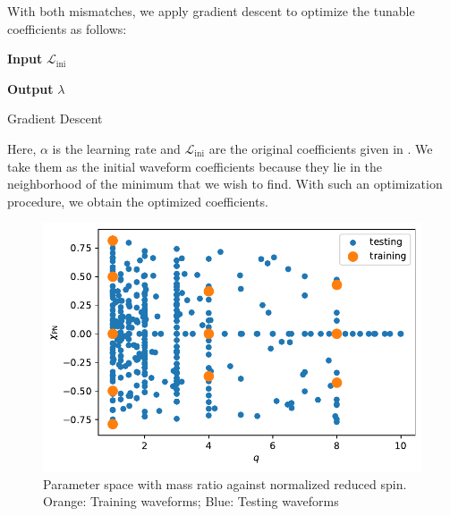 \documentclass[twocolumn]{aastex631}
\begin{document}
With both mismatches, we apply gradient descent to optimize the tunable coefficients as follows: 
\begin{algorithm}[H]
	\hspace*{\algorithmicindent} \textbf{Input} $\mathcal{L}_{\mathrm{ini}}$
	\begin{algorithmic}[1]
		\EndWhile
	\end{algorithmic}
	\hspace*{\algorithmicindent} \textbf{Output} $\lambda$
	\caption{Gradient Descent}
\end{algorithm}
Here, $\alpha$ is the learning rate and $\mathcal{L}_{\mathrm{ini}}$ are the original coefficients given in \cite{khan2016frequency}. We take them as the initial waveform coefficients because they lie in the neighborhood of the minimum that we wish to find. With such an optimization procedure, we obtain the optimized coefficients. 

\begin{figure}[t]
	\centering
	\includegraphics[width=\columnwidth]{../static/intrin_space.pdf}
	\caption{Parameter space with mass ratio against normalized reduced spin. Orange: Training waveforms; Blue: Testing waveforms}
	\label{fig:intrin_space}
\end{figure}
\end{document}
